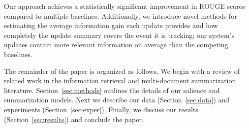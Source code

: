 Our approach achieves a statistically significant improvement in ROUGE scores 
compared to multiple baselines. Additionally, we introduce novel methods for 
estimating the average information gain each update provides and how 
completely the update summary covers the event it is tracking; our system's 
updates contain more relevant information on average than the competing 
baselines.


The remainder of the paper is organized as follows. We begin with a review of 
related work in the information retrieval and multi-document summarization 
literature. Section~\ref{sec:methods} outlines the details of our salience 
and summarization models. Next we describe our data (Section~\ref{sec:data}) 
and experiments (Section~\ref{sec:exper}). Finally, we discuss our results 
(Section~\ref{sec:results}) and conclude the paper.

